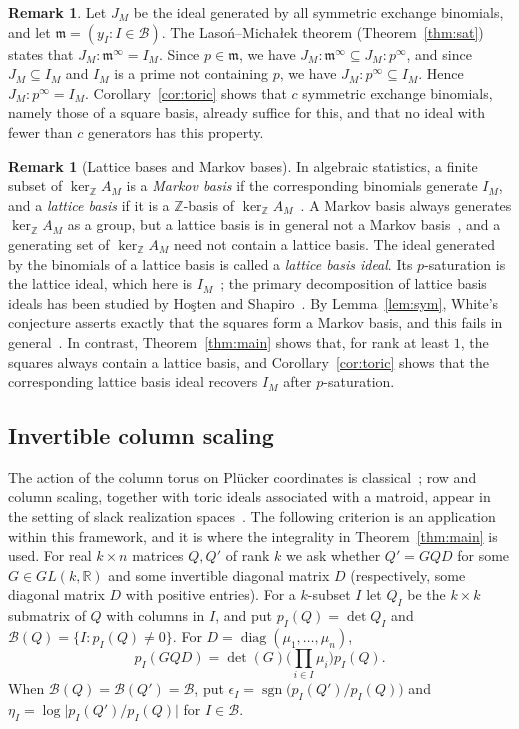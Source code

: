 \documentclass[11pt,a4paper]{article}
\theoremstyle{plain}
\theoremstyle{definition}
\newtheorem{remark}[theorem]{Remark}
\newcommand{\R}{\mathbb R}
\newcommand{\Z}{\mathbb Z}
\newcommand{\kerZ}{\ker_{\Z}\!A_M}
\newcommand{\bs}{\mathcal B}
\newcommand{\sgn}{\operatorname{sgn}}
\newcommand{\LM}{Laso\'n--Micha\l{}ek}
\begin{document}
\begin{remark}
Let $J_M$ be the ideal generated by all symmetric exchange binomials, and let $\mathfrak m=(y_I:I\in\bs)$. The \LM{} theorem (Theorem~\ref{thm:sat}) states that $J_M:\mathfrak m^\infty=I_M$. Since $p\in\mathfrak m$, we have $J_M:\mathfrak m^\infty\subseteq J_M:p^\infty$, and since $J_M\subseteq I_M$ and $I_M$ is a prime not containing $p$, we have $J_M:p^\infty\subseteq I_M$. Hence $J_M:p^\infty=I_M$. Corollary~\ref{cor:toric} shows that $c$ symmetric exchange binomials, namely those of a square basis, already suffice for this, and that no ideal with fewer than $c$ generators has this property.
\end{remark}

\begin{remark}[Lattice bases and Markov bases]\label{rem:markov}
In algebraic statistics, a finite subset of $\kerZ$ is a \emph{Markov basis} if the corresponding binomials generate $I_M$, and a \emph{lattice basis} if it is a $\Z$-basis of $\kerZ$~\cite{DS98}. A Markov basis always generates $\kerZ$ as a group, but a lattice basis is in general not a Markov basis~\cite{DS98}, and a generating set of $\kerZ$ need not contain a lattice basis. The ideal generated by the binomials of a lattice basis is called a \emph{lattice basis ideal}. Its $p$-saturation is the lattice ideal, which here is $I_M$~\cite{ES96}; the primary decomposition of lattice basis ideals has been studied by Ho\c{s}ten and Shapiro~\cite{HS00}. By Lemma~\ref{lem:sym}, White's conjecture asserts exactly that the squares form a Markov basis, and this fails in general~\cite{Lar26}. In contrast, Theorem~\ref{thm:main} shows that, for rank at least $1$, the squares always contain a lattice basis, and Corollary~\ref{cor:toric} shows that the corresponding lattice basis ideal recovers $I_M$ after $p$-saturation.
\end{remark}

\subsection{Invertible column scaling}\label{sec:criterion}
The action of the column torus on Pl\"ucker coordinates is classical~\cite{GGMS87,DW91}; row and column scaling, together with toric ideals associated with a matroid, appear in the setting of slack realization spaces~\cite{BW19}. The following criterion is an application within this framework, and it is where the integrality in Theorem~\ref{thm:main} is used. For real $k\times n$ matrices $Q,Q'$ of rank $k$ we ask whether $Q'=GQD$ for some $G\in GL(k,\R)$ and some invertible diagonal matrix $D$ (respectively, some diagonal matrix $D$ with positive entries). For a $k$-subset $I$ let $Q_I$ be the $k\times k$ submatrix of $Q$ with columns in $I$, and put $p_I(Q)=\det Q_I$ and $\bs(Q)=\{I:p_I(Q)\ne0\}$. For $D=\operatorname{diag}(\mu_1,\dots,\mu_n)$,
\begin{equation}\label{eq:plucker}
p_I(GQD)=\det(G)\Big(\prod_{i\in I}\mu_i\Big)p_I(Q).
\end{equation}
When $\bs(Q)=\bs(Q')=\bs$, put $\epsilon_I=\sgn\big(p_I(Q')/p_I(Q)\big)$ and $\eta_I=\log\big|p_I(Q')/p_I(Q)\big|$ for $I\in\bs$.
\end{document}

